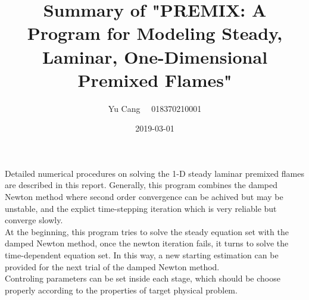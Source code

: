 \documentclass[paper=a4, fontsize=11pt]{scrartcl}
\title{Summary of "PREMIX: A Program for Modeling Steady, Laminar, One-Dimensional Premixed Flames"}
\author{Yu Cang \ \ 018370210001}
\date{2019-03-01}
\begin{document}
\maketitle

Detailed numerical procedures on solving the 1-D steady laminar premixed flames are described in this report. Generally, this program combines the damped Newton method where second order convergence can be achived but may be unstable, and the explict time-stepping iteration which is very reliable but converge slowly.\\
At the beginning, this program tries to solve the steady equation set with the damped Newton method, once the newton iteration fails, it turns to solve the time-dependent equation set. In this way,  a new starting estimation can be provided for the next trial of the damped Newton method. \\
Controling parameters can be set inside each stage, which should be choose properly according to the properties of target physical problem.

	
\end{document}
